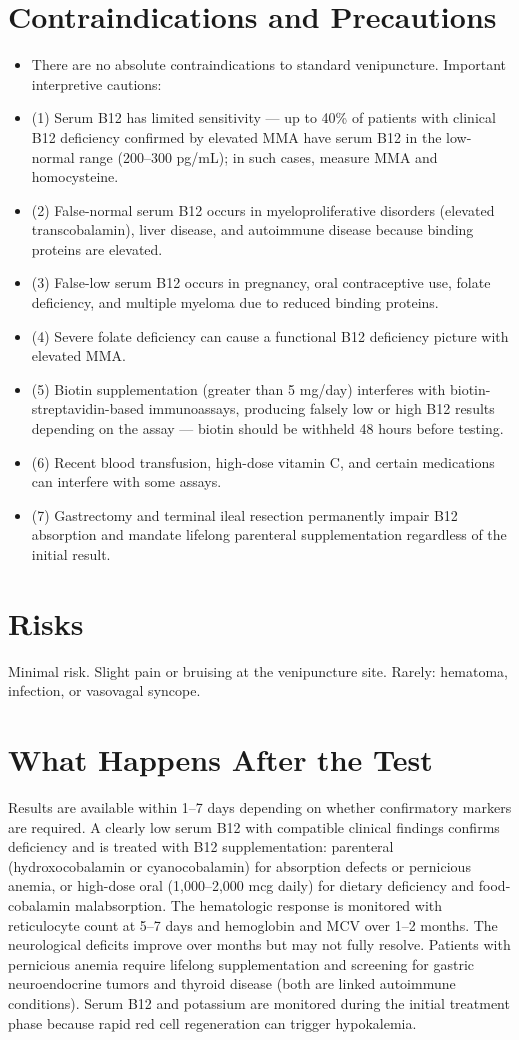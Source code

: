 \section*{Contraindications and Precautions}
\begin{itemize}
  \item There are no absolute contraindications to standard venipuncture. Important interpretive cautions:
  \item (1) Serum B12 has limited sensitivity --- up to 40\% of patients with clinical B12 deficiency confirmed by elevated MMA have serum B12 in the low-normal range (200--300 pg/mL); in such cases, measure MMA and homocysteine.
  \item (2) False-normal serum B12 occurs in myeloproliferative disorders (elevated transcobalamin), liver disease, and autoimmune disease because binding proteins are elevated.
  \item (3) False-low serum B12 occurs in pregnancy, oral contraceptive use, folate deficiency, and multiple myeloma due to reduced binding proteins.
  \item (4) Severe folate deficiency can cause a functional B12 deficiency picture with elevated MMA.
  \item (5) Biotin supplementation (greater than 5 mg/day) interferes with biotin-streptavidin-based immunoassays, producing falsely low or high B12 results depending on the assay --- biotin should be withheld 48 hours before testing.
  \item (6) Recent blood transfusion, high-dose vitamin C, and certain medications can interfere with some assays.
  \item (7) Gastrectomy and terminal ileal resection permanently impair B12 absorption and mandate lifelong parenteral supplementation regardless of the initial result.
\end{itemize}
\section*{Risks}
Minimal risk. Slight pain or bruising at the venipuncture site. Rarely: hematoma, infection, or vasovagal syncope.

\section*{What Happens After the Test}
Results are available within 1--7 days depending on whether confirmatory markers are required. A clearly low serum B12 with compatible clinical findings confirms deficiency and is treated with B12 supplementation: parenteral (hydroxocobalamin or cyanocobalamin) for absorption defects or pernicious anemia, or high-dose oral (1,000--2,000 mcg daily) for dietary deficiency and food-cobalamin malabsorption. The hematologic response is monitored with reticulocyte count at 5--7 days and hemoglobin and MCV over 1--2 months. The neurological deficits improve over months but may not fully resolve. Patients with pernicious anemia require lifelong supplementation and screening for gastric neuroendocrine tumors and thyroid disease (both are linked autoimmune conditions). Serum B12 and potassium are monitored during the initial treatment phase because rapid red cell regeneration can trigger hypokalemia.

